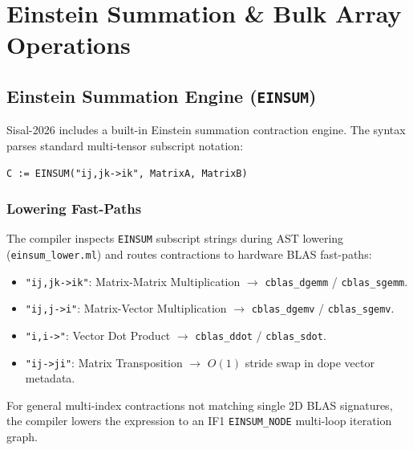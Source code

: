 \chapter{Einstein Summation \& Bulk Array Operations}
\label{chap:einsum_bulk_ops}

\section{Einstein Summation Engine (\texttt{EINSUM})}
Sisal-2026 includes a built-in Einstein summation contraction engine. The syntax parses standard multi-tensor subscript notation:

\begin{lstlisting}[caption={Einstein Summation Syntax}]
C := EINSUM("ij,jk->ik", MatrixA, MatrixB)
\end{lstlisting}

\subsection{Lowering Fast-Paths}
The compiler inspects \texttt{EINSUM} subscript strings during AST lowering (\texttt{einsum\_lower.ml}) and routes contractions to hardware BLAS fast-paths:
\begin{itemize}
    \item \texttt{"ij,jk->ik"}: Matrix-Matrix Multiplication $\rightarrow$ \texttt{cblas\_dgemm} / \texttt{cblas\_sgemm}.
    \item \texttt{"ij,j->i"}: Matrix-Vector Multiplication $\rightarrow$ \texttt{cblas\_dgemv} / \texttt{cblas\_sgemv}.
    \item \texttt{"i,i->"}: Vector Dot Product $\rightarrow$ \texttt{cblas\_ddot} / \texttt{cblas\_sdot}.
    \item \texttt{"ij->ji"}: Matrix Transposition $\rightarrow$ $O(1)$ stride swap in dope vector metadata.
\end{itemize}

For general multi-index contractions not matching single 2D BLAS signatures, the compiler lowers the expression to an IF1 \texttt{EINSUM\_NODE} multi-loop iteration graph.

